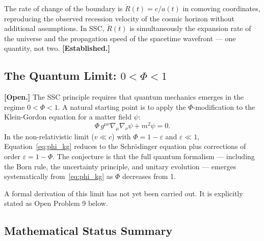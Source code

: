 \documentclass[12pt,a4paper]{article}
\begin{document}
The rate of change of the boundary is $\dot{R}(t) = c/a(t)$ in
comoving coordinates, reproducing the observed recession velocity
of the cosmic horizon without additional assumptions. In SSC,
$\dot{R}(t)$ is simultaneously the expansion rate of the universe
and the propagation speed of the spacetime wavefront — one quantity,
not two. \textbf{[Established.]}

\subsection{The Quantum Limit: \texorpdfstring{$0 < \Phi < 1$}{0 < Phi < 1}}

\textbf{[Open.]} The SSC principle requires that quantum mechanics
emerges in the regime $0 < \Phi < 1$. A natural starting point
is to apply the $\Phi$-modification to the Klein-Gordon equation
for a matter field $\psi$:
\begin{equation}
  \Phi\,g^{\mu\nu}\nabla_\mu\nabla_\nu\psi + m^2\psi = 0.
  \label{eq:phi_kg}
\end{equation}
In the non-relativistic limit ($v \ll c$) with $\Phi = 1 - \varepsilon$
and $\varepsilon \ll 1$, Equation~\eqref{eq:phi_kg} reduces to the
Schrödinger equation plus corrections of order $\varepsilon = 1 -
\Phi$. The conjecture is that the full quantum formalism — including
the Born rule, the uncertainty principle, and unitary evolution —
emerges systematically from~\eqref{eq:phi_kg} as $\Phi$ decreases
from 1.

A formal derivation of this limit has not yet been carried out. It
is explicitly stated as Open Problem 9 below.

\subsection{Mathematical Status Summary}
\end{document}
